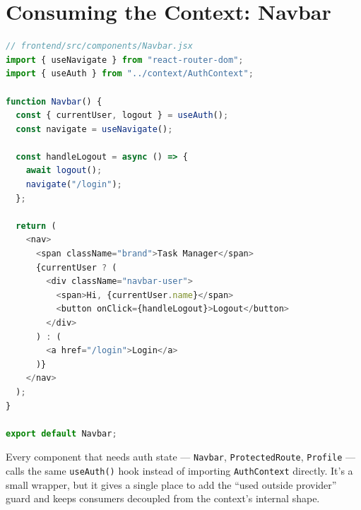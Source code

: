 \section{Consuming the Context: Navbar}

\begin{lstlisting}[language=JavaScript]
// frontend/src/components/Navbar.jsx
import { useNavigate } from "react-router-dom";
import { useAuth } from "../context/AuthContext";

function Navbar() {
  const { currentUser, logout } = useAuth();
  const navigate = useNavigate();

  const handleLogout = async () => {
    await logout();
    navigate("/login");
  };

  return (
    <nav>
      <span className="brand">Task Manager</span>
      {currentUser ? (
        <div className="navbar-user">
          <span>Hi, {currentUser.name}</span>
          <button onClick={handleLogout}>Logout</button>
        </div>
      ) : (
        <a href="/login">Login</a>
      )}
    </nav>
  );
}

export default Navbar;
\end{lstlisting}

\begin{tipbox}[TIP]
Every component that needs auth state --- \texttt{Navbar},
\texttt{ProtectedRoute}, \texttt{Profile} --- calls the same
\texttt{useAuth()} hook instead of importing \texttt{AuthContext} directly.
It's a small wrapper, but it gives a single place to add the
``used outside provider'' guard and keeps consumers decoupled from the
context's internal shape.
\end{tipbox}
